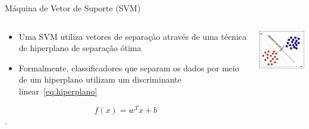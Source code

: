 \documentclass{beamer}
\begin{document}
\begin{frame}{Máquina de Vetor de Suporte (SVM)}
   \begin{block}{}
   
   \begin{columns}[c]
     \begin{column}{0.5\linewidth}
			 \begin{itemize}
				\item Uma SVM utiliza vetores de separação através de uma técnica de hiperplano de separação ótima

				\item Formalmente, classificadores que separam os dados por meio de um hiperplano utilizam um discriminante linear~\ref{eq:hiperplano}
			\end{itemize}

			\begin{equation}
			f(x)=w^Tx+b
			\label{eq:hiperplano}
			\end{equation}.
     \end{column}

     \begin{column}{0.5\linewidth}
				\includegraphics[width=4cm]{img/svmhyperplane.png}
    \end{column}
\end{columns}
\end{block}
\end{frame}




\end{document}
